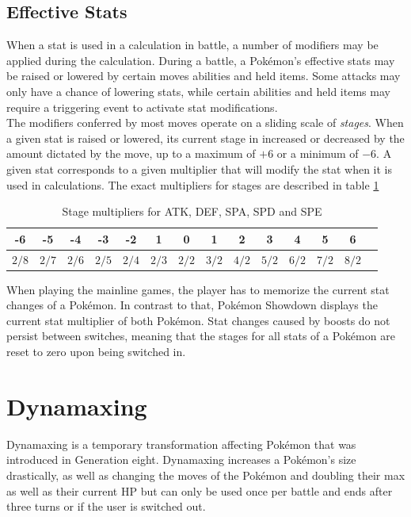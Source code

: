 \subsection{Effective Stats}
When a stat is used in a calculation in battle, a number of modifiers may be applied during the calculation.
During a battle, a Pokémon's effective stats may be raised or lowered by certain moves abilities and 
held items. Some attacks may only have a chance of lowering stats, while certain abilities and held items
may require a triggering event to activate stat modifications. \\
The modifiers conferred by most moves operate on a sliding scale of \textit{stages}. When a given stat is raised
or lowered, its current stage in increased or decreased by the amount dictated by the move, up to a maximum
of $+6$ or a minimum of $-6$. A given stat corresponds to a given multiplier that will modify the stat when it
is used in calculations. The exact multipliers for stages are described in table \ref{tab:boost-stage-multipliers}
\begin{table}[h]
	\centering
	\begin{tabular}{|c|c|c|c|c|c|c|c|c|c|c|c|c|c|}
		\hline
		-6 & -5 & -4 & -3 & -2 & 1 & 0 & 1 & 2 & 3 & 4 & 5 & 6 \\
		\hline
		$2/8$ & $2/7$ & $2/6$ & $2/5$ & $2/4$ & $2/3$ & $2/2$ &  $3/2$ &  $4/2$ &  $5/2$ &  $6/2$ &  $7/2$ & $8/2$ \\
		\hline
	\end{tabular} 
	\caption{Stage multipliers for \ac{ATK}, \ac{DEF}, \ac{SPA}, \ac{SPD} and \ac{SPE}}
	\label{tab:boost-stage-multipliers}
\end{table}
When playing the mainline games, the player has to memorize the current stat changes of a Pokémon. In contrast to that,
Pokémon Showdown displays the current stat multiplier of both Pokémon. Stat changes caused by boosts do not persist
between switches, meaning that the stages for all stats of a Pokémon are reset to zero upon being switched in.

\section{Dynamaxing}
Dynamaxing is a temporary transformation affecting Pokémon that was introduced in Generation eight. Dynamaxing increases
a Pokémon's size drastically, as well as changing the moves of the Pokémon and doubling their max as well as their current
\ac{HP} but can only be used once per battle and ends after three turns or if the user is switched out.

